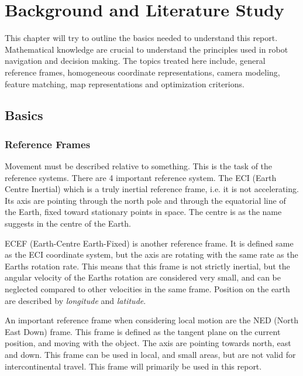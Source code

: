 


\chapter{Background and Literature Study}
This chapter will try to outline the basics needed to understand this report. Mathematical
knowledge are crucial to understand the principles used in robot navigation and decision
making. The topics treated here include, general reference frames, homogeneous coordinate
representations, camera modeling, feature matching, map representations and optimization
criterions.



\section{Basics}

\subsection{Reference Frames}
	Movement must be described relative to something. This is the task of the reference systems. There are
	4 important reference system. The ECI (Earth Centre Inertial) which is a truly inertial reference
	frame, i.e. it is not accelerating. Its axis are pointing through the north pole and through the
	equatorial line of the Earth, fixed toward stationary points in space. The centre is as the name
	suggests in the centre of the Earth. 
	
	ECEF (Earth-Centre Earth-Fixed) is another reference frame. It is defined same as the ECI coordinate
	system, but the axis are rotating with the same rate as the Earths rotation rate. This means that this frame
	is not
	strictly inertial, but the angular velocity of the Earths rotation are considered very small, and can
	be neglected compared to other velocities in the same frame. Position on the earth are described by
	\emph{longitude} and \emph{latitude}.

	An important reference frame when considering local motion are the NED (North East Down) frame. This
	frame is defined as the tangent plane on the current position, and moving with the object. The axis
	are pointing towards north, east and down. This frame can be used in local, and small areas, but are
	not valid for intercontinental travel. This frame will primarily be used in this report. 

